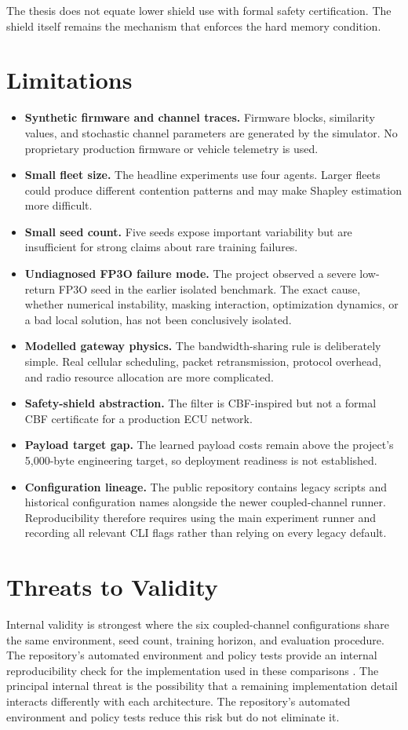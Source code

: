 \documentclass{iutbscthesis}
\begin{document}
The thesis does not equate lower shield use with formal safety certification. The shield itself remains the mechanism that enforces the hard memory condition.

\section{Limitations}
\begin{itemize}[leftmargin=*]
    \item \textbf{Synthetic firmware and channel traces.} Firmware blocks, similarity values, and stochastic channel parameters are generated by the simulator. No proprietary production firmware or vehicle telemetry is used.
    \item \textbf{Small fleet size.} The headline experiments use four agents. Larger fleets could produce different contention patterns and may make Shapley estimation more difficult.
    \item \textbf{Small seed count.} Five seeds expose important variability but are insufficient for strong claims about rare training failures.
    \item \textbf{Undiagnosed FP3O failure mode.} The project observed a severe low-return FP3O seed in the earlier isolated benchmark. The exact cause, whether numerical instability, masking interaction, optimization dynamics, or a bad local solution, has not been conclusively isolated.
    \item \textbf{Modelled gateway physics.} The bandwidth-sharing rule is deliberately simple. Real cellular scheduling, packet retransmission, protocol overhead, and radio resource allocation are more complicated.
    \item \textbf{Safety-shield abstraction.} The filter is CBF-inspired but not a formal CBF certificate for a production ECU network.
    \item \textbf{Payload target gap.} The learned payload costs remain above the project's 5,000-byte engineering target, so deployment readiness is not established.
    \item \textbf{Configuration lineage.} The public repository contains legacy scripts and historical configuration names alongside the newer coupled-channel runner. Reproducibility therefore requires using the main experiment runner and recording all relevant CLI flags rather than relying on every legacy default.
\end{itemize}

\section{Threats to Validity}
Internal validity is strongest where the six coupled-channel configurations share the same environment, seed count, training horizon, and evaluation procedure. The repository's automated environment and policy tests provide an internal reproducibility check for the implementation used in these comparisons \parencite{ma_reles_ota_repo}. The principal internal threat is the possibility that a remaining implementation detail interacts differently with each architecture. The repository's automated environment and policy tests reduce this risk but do not eliminate it.
\end{document}
